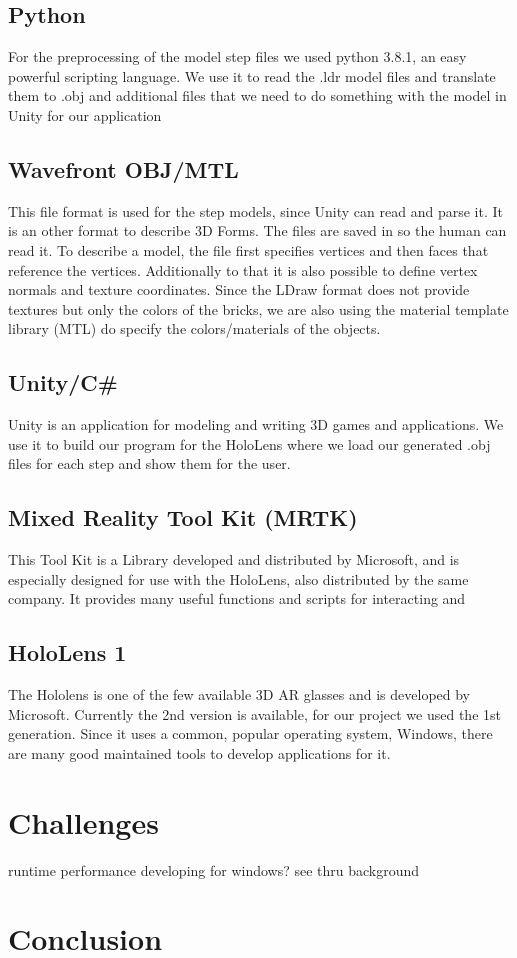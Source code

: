 \documentclass[11pt,a4paper]{article}
\begin{document}
	\subsection{Python}
	
	For the preprocessing of the model step files we used python 3.8.1, an easy powerful scripting language. We use it to read the .ldr model files and translate them to .obj and additional files that we need to do something with the model in Unity for our application 
	
	\subsection{Wavefront OBJ/MTL}
	
	This file format is used for the step models, since Unity can read and parse it. It is an other format to describe 3D Forms. The files are saved in  so the human can read it. To describe a model, the file first specifies vertices and then faces that reference the vertices. Additionally to that it is also possible to define vertex normals and texture coordinates. Since the LDraw format does not provide textures but only the colors of the bricks, we are also using the material template library (MTL) do specify the colors/materials of the objects.  
	
	\subsection{Unity/C\#}
	
	Unity is an application for modeling and writing 3D games and applications. We use it to build our program for the HoloLens where we load our generated .obj files for each step and show them for the user.
	
	\subsection{Mixed Reality Tool Kit (MRTK)}
	
	This Tool Kit is a Library developed and distributed by Microsoft, and is especially designed for use with the HoloLens, also distributed by the same company. It provides many useful functions and scripts for interacting and
	
	\subsection{HoloLens 1}
	
	The Hololens is one of the few available 3D AR glasses and is developed by Microsoft. Currently the 2nd version is available, for our project we used the 1st generation.  Since it uses a common, popular operating system, Windows,  there are many good maintained tools to develop applications for it.

\section{Challenges}
runtime
performance
developing for windows?
see thru background

\section{Conclusion}




\end{document}
